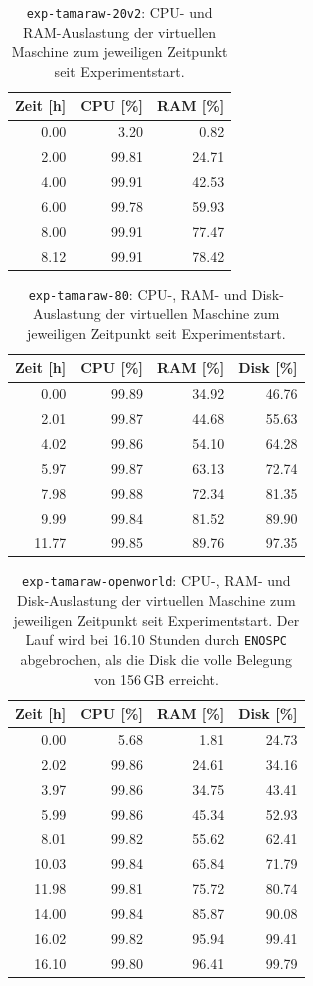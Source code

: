\begin{table}[H]
\centering
\caption{\texttt{exp-tamaraw-20v2}: CPU- und RAM-Auslastung der virtuellen Maschine zum jeweiligen Zeitpunkt seit Experimentstart.}
\label{tab:app_perfmon_tamaraw20v2}
\begin{tabular}{rrr}
\hline
Zeit [h] & CPU [\%] & RAM [\%] \\
\hline
 0.00 &   3.20 &  0.82 \\
 2.00 &  99.81 & 24.71 \\
 4.00 &  99.91 & 42.53 \\
 6.00 &  99.78 & 59.93 \\
 8.00 &  99.91 & 77.47 \\
 8.12 &  99.91 & 78.42 \\
\hline
\end{tabular}
\end{table}

\begin{table}[H]
\centering
\caption{\texttt{exp-tamaraw-80}: CPU-, RAM- und Disk-Auslastung der virtuellen Maschine zum jeweiligen Zeitpunkt seit Experimentstart.}
\label{tab:app_perfmon_tamaraw80}
\begin{tabular}{rrrr}
\hline
Zeit [h] & CPU [\%] & RAM [\%] & Disk [\%] \\
\hline
  0.00 & 99.89 & 34.92 & 46.76 \\
  2.01 & 99.87 & 44.68 & 55.63 \\
  4.02 & 99.86 & 54.10 & 64.28 \\
  5.97 & 99.87 & 63.13 & 72.74 \\
  7.98 & 99.88 & 72.34 & 81.35 \\
  9.99 & 99.84 & 81.52 & 89.90 \\
 11.77 & 99.85 & 89.76 & 97.35 \\
\hline
\end{tabular}
\end{table}

\begin{table}[H]
\centering
\caption{\texttt{exp-tamaraw-openworld}: CPU-, RAM- und Disk-Auslastung der virtuellen Maschine zum jeweiligen Zeitpunkt seit Experimentstart. Der Lauf wird bei 16.10 Stunden durch \texttt{ENOSPC} abgebrochen, als die Disk die volle Belegung von 156\,GB erreicht.}
\label{tab:app_perfmon_openworld}
\begin{tabular}{rrrr}
\hline
Zeit [h] & CPU [\%] & RAM [\%] & Disk [\%] \\
\hline
  0.00 &  5.68 &  1.81 & 24.73 \\
  2.02 & 99.86 & 24.61 & 34.16 \\
  3.97 & 99.86 & 34.75 & 43.41 \\
  5.99 & 99.86 & 45.34 & 52.93 \\
  8.01 & 99.82 & 55.62 & 62.41 \\
 10.03 & 99.84 & 65.84 & 71.79 \\
 11.98 & 99.81 & 75.72 & 80.74 \\
 14.00 & 99.84 & 85.87 & 90.08 \\
 16.02 & 99.82 & 95.94 & 99.41 \\
 16.10 & 99.80 & 96.41 & 99.79 \\
\hline
\end{tabular}
\end{table}
